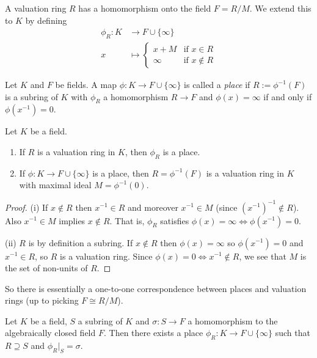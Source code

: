 A valuation ring $R$ has a homomorphism onto the field $F = R/M$.
We extend this to $K$ by defining
\begin{align*}
    \phi_R \colon K &\to F \cup \{\infty\} \\
                  x &\mapsto \begin{cases}
                      x + M  & \text{if } x \in R \\
                      \infty & \text{if } x \notin R
                  \end{cases}
\end{align*}

\begin{definition}
    Let $K$ and $F$ be fields.
    A map $\phi \colon K \to F \cup \{\infty\}$ is called a \emph{place} if $R := \phi^{-1}(F)$ is a subring of $K$ with $\phi_R$ a homomorphism $R \to F$ and $\phi(x) = \infty$ if and only if $\phi(x^{-1}) = 0$.
\end{definition}

\begin{lemma}
    Let $K$ be a field.
    \begin{enumerate}
        \item[(i)] If $R$ is a valuation ring in $K$, then $\phi_R$ is a place.
        \item[(ii)] If $\phi \colon K \to F \cup \{\infty\}$ is a place, then $R = \phi^{-1}(F)$ is a valuation ring in $K$ with maximal ideal $M = \phi^{-1}(0)$.
    \end{enumerate}
\end{lemma}

\begin{proof}
    (i) If $x \notin R$ then $x^{-1} \in R$ and moreover $x^{-1} \in M$ (since $(x^{-1})^{-1} \notin R$).
    Also $x^{-1} \in M$ implies $x \notin R$.
    That is, $\phi_R$ satisfies $\phi(x) = \infty \Leftrightarrow \phi(x^{-1}) = 0$.

    (ii) $R$ is by definition a subring.
    If $x \notin R$ then $\phi(x) = \infty$ so $\phi(x^{-1}) = 0$ and $x^{-1} \in R$, so $R$ is a valuation ring.
    Since $\phi(x) = 0 \Leftrightarrow x^{-1} \notin R$, we see that $M$ is the set of non-units of $R$.
\end{proof}

So there is essentially a one-to-one correspondence between places and valuation rings (up to picking $F \cong R / M$).

\begin{theorem}
    Let $K$ be a field, $S$ a subring of $K$ and $\sigma \colon S \to F$ a homomorphism to the algebraically closed field $F$.
    Then there exists a place $\phi_R \colon K \to F \cup \{\infty\}$ such that $R \supseteq S$ and $\phi_R|_S = \sigma$.
\end{theorem}

